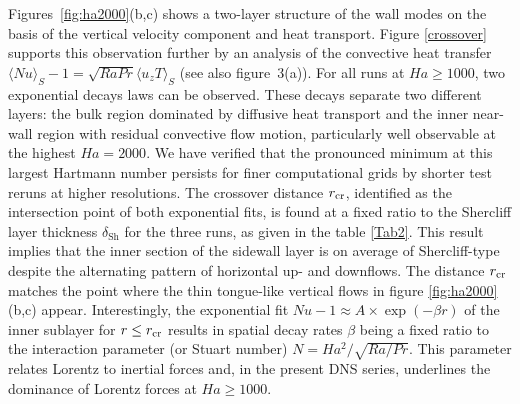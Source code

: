 \documentclass{jfm}
\begin{document}
Figures~\ref{fig:ha2000}(b,c) shows a two-layer structure of the wall modes on the basis of the vertical velocity 
component and heat transport. Figure \ref{crossover} supports this observation further by an analysis of the convective heat transfer
$\langle Nu\rangle_S-1=\sqrt{Ra Pr} \langle u_z T\rangle_S$ (see also figure~3(a)). For all runs at $Ha \ge 1000$,
two exponential decays laws can be observed. These decays separate two different layers: the bulk region dominated by 
diffusive heat transport and the inner near-wall region with residual convective flow motion, particularly well observable 
at the highest $Ha=2000$. We have verified that the pronounced minimum at this largest Hartmann number persists 
for finer computational grids by shorter test reruns at higher resolutions.
The crossover distance $r_{\rm cr}$, identified as the intersection point of both exponential fits, 
is found at a fixed ratio to the Shercliff layer thickness $\delta_{\text{Sh}}$ for the three runs, as given in the table \ref{Tab2}. 
This result implies that the inner section of the sidewall layer is on average of Shercliff-type despite the alternating pattern of 
horizontal up- and downflows. The distance $r_{\rm cr}$ matches the point where the thin tongue-like vertical flows in 
figure \ref{fig:ha2000}(b,c) appear. Interestingly, the exponential fit $Nu-1 \approx A \times \exp(-\beta r)$ of the inner sublayer for 
$r \le r_{\rm cr}$ results in spatial decay rates $\beta$ being a fixed ratio to the interaction parameter (or Stuart number) 
$N = Ha^2/\sqrt{Ra/Pr}$. This parameter relates Lorentz to inertial forces and, in the present DNS series, underlines the dominance 
of Lorentz forces at $Ha \ge 1000$.
\end{document}
